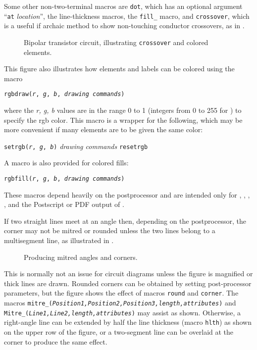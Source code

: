 \pagebreak
Some other non-two-terminal macros are {\tt dot}, which has an
optional argument ``{\tt at} {\sl location}'', the line-thickness
macros, the {\tt fill\_} macro, and {\tt crossover}, which is a useful if
archaic method to show non-touching conductor crossovers, as in
.
\begin{figure}[h!t]
   
   \caption{Bipolar transistor circuit, illustrating {\tt crossover}
      and colored elements.}
   \label{bistable}
   \end{figure}

This figure also illustrates how elements and labels can be colored
using the macro
\par
{\tt rgbdraw({\sl r}, {\sl g}, {\sl b}, {\sl drawing commands})}
\par
\noindent
where the {\sl r, g, b} values are in the range 0 to 1
(integers from 0 to 255 for \SVG) to specify the rgb color.
This macro is a wrapper for the following, which may be more convenient
if many elements are to be given the same color:

   {\tt setrgb({\sl r}, {\sl g}, {\sl b})}
      \hfill\break\hspace*{\parindent}%
   {\sl drawing commands}
      \hfill\break\hspace*{\parindent}%
   {\tt resetrgb}

A macro is also provided for colored fills:

{\tt rgbfill({\sl r}, {\sl g}, {\sl b}, {\sl drawing commands})}

\noindent%
These macros depend heavily on the postprocessor and are intended only for 
\PSTricks, \TPGF, \MetaPost, \SVG, and the Postscript or PDF output of \dpic.

%
If two straight lines meet at an angle then, depending on the postprocessor,
the corner may not be mitred or rounded unless the two lines belong to
a multisegment line, as illustrated in .
\begin{figure}[ht]
   
   \caption{Producing mitred angles and corners.}
   \label{Corners}
   \end{figure}
This is normally
not an issue for circuit diagrams unless the figure is magnified or thick
lines are drawn.  Rounded corners can be obtained by setting post-processor
parameters, but the figure shows the effect of
macros {\tt round} and {\tt corner}.
The macros
{\tt mitre\_({\sl Position1,Position2,Position3,length,attributes})}
and
{\tt Mitre\_({\sl Line1,Line2,length,attributes})}
may assist as shown.
Otherwise, a right-angle line can be extended
by half the line thickness (macro {\tt hlth}) as shown on the upper row
of the figure,
or a two-segment line can be overlaid at the corner to produce the same effect.


